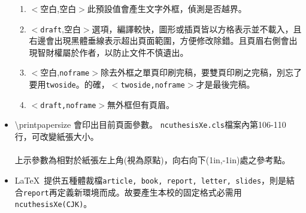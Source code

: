 \begin{itemize}
\begin{enumerate}
\item $<$空白,空白$>$此預設值會產生文字外框，偵測是否越界。
\item $<${\tt draft},空白$>$選項，編譯較快，圖形或插頁皆以方格表示並不載入，且右邊會出現黑體垂線表示超出頁面範圍，方便修改除錯。且頁眉右側會出現智財權屬於作者，以防止文件不慎遺出。
\item$<$空白,{\tt noframe}$>$除去外框之{\color{red}單頁印刷完稿}，要雙頁印刷之完稿，別忘了要用{\tt twoside}。的確，$<${\tt twoside,noframe}$>$才是最後完稿。
\item$<${\tt draft,noframe}$>$無外框但有頁眉。
\end{enumerate}
\item \textbackslash printpapersize 會印出目前頁面參數。
{\tt ncuthesisXe.cls}檔案內第106-110行，可改變紙張大小。\\
\printpagesize \\               %
上示參數為相對於紙張左上角(視為原點)，向右向下(1in,-1in)處之參考點。
\item \LaTeX\ 提供五種體裁檔{\tt article, book, report, letter, slides}，則是結合{\tt report}再定義新環境而成。故要產生本校的固定格式必需用{\tt ncuthesisXe(CJK)}。
\end{itemize}
